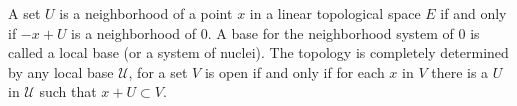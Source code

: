 A set $U$ is a neighborhood of a point $x$ in a linear topological space $E$ if and only if $-x + U$ is a neighborhood of $0$. A base for the neighborhood system of $0$ is called a local base (or a system of nuclei). The topology is completely determined by any local base $\mathcal{U}$, for a set $V$ is open if and only if for each $x$ in $V$ there is a $U$ in $\mathcal{U}$ such that $x + U \subset V$.
